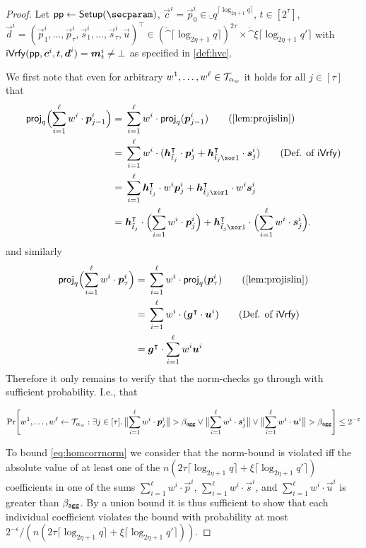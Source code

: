 \begin{proof}
Let $\params \gets \setup(\secparam)$, $\vec{c}^i = \vec{p}_0^i \in \ring_q^{\lceil\log_{2\eta+1} q\rceil}$, $t\in[2^\tau]$, $\vec{d}^i = (\vec{p}^i_1,\dots,\vec{p}^i_{\tau},\vec{s}^i_1, \dots, \vec{s}^i_{\tau},\vec{u})^\intercal\in (\ring^{\lceil\log_{2\eta+1} q\rceil})^{2\tau} \times \ring^{\xi\lceil\log_{2\eta+1} q'\rceil}$ with $\mathsf{iVrfy}(\mathsf{pp},\boldsymbol{c}^i,t,\boldsymbol{d}^i) = \boldsymbol{m}_t^i \neq \bot$
as specified in \autoref{def:hvc}.

We first note that even for arbitrary $w^1,\dots,w^{\ell}\in\mathcal{T}_{\alpha_w}$ it holds for all $j\in[\tau]$ that
\begin{align*}
  \proj_q\Bigl(\sum_{i=1}^{\ell}w^i\cdot\vec{p}_{j-1}^i\Bigr) ={}&\sum_{i=1}^{\ell}w^i\cdot\proj_q(\vec{p}_{j-1}^i)\tag{\autoref{lem:projislin}}\\
  ={}&\sum_{i=1}^{\ell}w^i\cdot(\vec{h}_{\tilde t_j}^\intercal\cdot \vec{p}^i_{j} + \vec{h}_{\tilde t_j\xor 1}^\intercal \cdot \vec{s}^i_{j})\tag{Def. of $\iverify$}\\
  ={}&\sum_{i=1}^{\ell}\vec{h}_{\tilde t_j}^\intercal\cdot w^i \vec{p}^i_{j} + \vec{h}_{\tilde t_j\xor 1}^\intercal\cdot w^i  \vec{s}^i_{j}\\  
  ={}& \vec{h}_{\tilde t_j}^\intercal\cdot \Bigl(\sum_{i=1}^{\ell}w^i\cdot\vec{p}^i_{j}\Bigr) + \vec{h}_{\tilde t_j \xor 1}^\intercal \cdot \Bigl(\sum_{i=1}^{\ell}w^i\cdot\vec{s}^i_{j}\Bigr).
\end{align*}
and similarly
\begin{align*}
  \proj_q\Bigl(\sum_{i=1}^{\ell}w^i\cdot\vec{p}_{\tau}^i\Bigr) ={}&\sum_{i=1}^{\ell}w^i\cdot\proj_q(\vec{p}_{\tau}^i)\tag{\autoref{lem:projislin}}\\
  ={}&\sum_{i=1}^{\ell}w^i\cdot(\vec{g}^\intercal\cdot \vec{u}^i)\tag{Def. of $\iverify$}\\
  ={}&\vec{g}^\intercal\cdot\sum_{i=1}^{\ell}w^i\vec{u}^i 
\end{align*}
Therefore it only remains to verify that the norm-checks go through with sufficient probability. I.e., that

\[
    \Pr\mleft[
      w^1,\dots,w^{\ell} \gets \tern_{\alpha_w} : \exists j\in[\tau]\ldotp
      \bigl\Vert\sum_{i=1}^{\ell}w^i\cdot \vec{p}_j^i\bigr\Vert > \bagg \lor \bigl\Vert\sum_{i=1}^{\ell}w^i\cdot \vec{s}_j^i\bigr\Vert \lor \bigl\Vert\sum_{i=1}^{\ell}w^i\cdot\vec{u}^i\bigr\Vert > \bagg
    \mright] \leq 2^{-\varepsilon}
  \]
  
  To bound \autoref{eq:homcorrnorm} we consider that the norm-bound is violated iff the absolute value of at least one of the $n(2\tau\lceil\log_{2\eta+1} q\rceil  + \xi\lceil\log_{2\eta+1} q'\rceil)$ coefficients in one of the sums $\sum_{i=1}^{\ell} w^i\cdot\vec{p}^i$, $\sum_{i=1}^{\ell} w^i\cdot\vec{s}^i$, and $\sum_{i=1}^{\ell} w^i\cdot\vec{u}^i$ is greater than $\beta_{\mathsf{agg}}$.
  By a union bound it is thus sufficient to show that each individual coefficient violates the bound with probability at most $2^{-\epsilon}/(n(2\tau\lceil\log_{2\eta+1} q\rceil + \xi\lceil\log_{2\eta+1} q'\rceil))$.
  

\end{proof}
